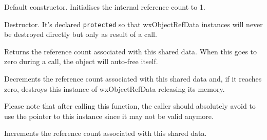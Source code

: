 





\label{wxobjectrefdatactor}


Default constructor. Initialises the internal reference count to 1.

\label{wxobjectrefdatadtor}


Destructor. It's declared {\tt protected} so that wxObjectRefData instances will never
be destroyed directly but only as result of a  call.

\label{wxobjectrefdatagetrefcount}


Returns the reference count associated with this shared data.
When this goes to zero during a  call, the object
will auto-free itself.

\label{wxobjectrefdatadecref}


Decrements the reference count associated with this shared data and, if it reaches zero,
destroys this instance of wxObjectRefData releasing its memory.

Please note that after calling this function, the caller should absolutely avoid to use
the pointer to this instance since it may not be valid anymore.

\label{wxobjectrefdataincref}


Increments the reference count associated with this shared data.


